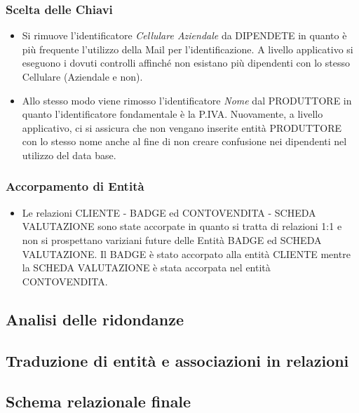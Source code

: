 \documentclass[12pt]{article}
\begin{document}
\subsubsection{Scelta delle Chiavi}

\begin{itemize}
    \item Si rimuove l'identificatore \textit{Cellulare Aziendale} da DIPENDETE
    in quanto è più frequente l'utilizzo della Mail per l'identificazione.  
    A livello applicativo si eseguono i dovuti controlli affinché non esistano
    più dipendenti con lo stesso Cellulare (Aziendale e non).
    \item Allo stesso modo viene rimosso l'identificatore \textit{Nome} dal
    PRODUTTORE in quanto l'identificatore fondamentale è la P.IVA. Nuovamente, a
    livello applicativo, ci si assicura che non vengano inserite entità
    PRODUTTORE con lo stesso nome anche al fine di non creare confusione nei
    dipendenti nel utilizzo del data base. 
\end{itemize}

\subsubsection{Accorpamento di Entità}

\begin{itemize}
    \item Le relazioni CLIENTE - BADGE ed CONTOVENDITA - SCHEDA VALUTAZIONE sono
    state accorpate in quanto si tratta di relazioni 1:1 e non si
    prospettano variziani future delle Entità BADGE ed SCHEDA
    VALUTAZIONE. Il BADGE è stato accorpato alla entità CLIENTE mentre
    la SCHEDA VALUTAZIONE è stata accorpata nel entità CONTOVENDITA.
\end{itemize}

\subsection{Analisi delle ridondanze}

\subsection{Traduzione di entità e associazioni in relazioni}

\subsection{Schema relazionale finale}
\end{document}
